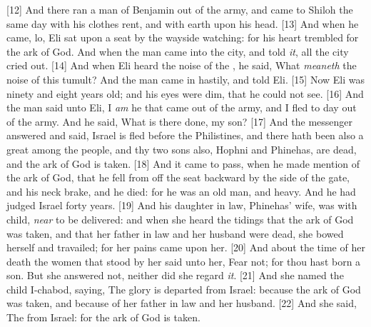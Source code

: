 [12] \textcolor[cmyk]{0.99998,1,0,0}{And there ran a man of Benjamin out of the army, and came to Shiloh the same day with his clothes rent, and with earth upon his head.}
[13] \textcolor[cmyk]{0.99998,1,0,0}{And when he came, lo, Eli sat upon a seat by the wayside watching: for his heart trembled for the ark of God. And when the man came into the city, and told \emph{it}, all the city cried out.}
[14] \textcolor[cmyk]{0.99998,1,0,0}{And when Eli heard the noise of the , he said, What \emph{meaneth} the noise of this tumult? And the man came in hastily, and told Eli.}
[15] \textcolor[cmyk]{0.99998,1,0,0}{Now Eli was ninety and eight years old; and his eyes were dim, that he could not see.}
[16] \textcolor[cmyk]{0.99998,1,0,0}{And the man said unto Eli, I \emph{am} he that came out of the army, and I fled to day out of the army. And he said, What is there done, my son?}
[17] \textcolor[cmyk]{0.99998,1,0,0}{And the messenger answered and said, Israel is fled before the Philistines, and there hath been also a great  among the people, and thy two sons also, Hophni and Phinehas, are dead, and the ark of God is taken.}
[18] \textcolor[cmyk]{0.99998,1,0,0}{And it came to pass, when he made mention of the ark of God, that he fell from off the seat backward by the side of the gate, and his neck brake, and he died: for he was an old man, and heavy. And he had judged Israel forty years.}
[19] \textcolor[cmyk]{0.99998,1,0,0}{And his daughter in law, Phinehas' wife, was with child, \emph{near} to be delivered: and when she heard the tidings that the ark of God was taken, and that her father in law and her husband were dead, she bowed herself and travailed; for her pains came upon her.}
[20] \textcolor[cmyk]{0.99998,1,0,0}{And about the time of her death the women that stood by her said unto her, Fear not; for thou hast born a son. But she answered not, neither did she regard \emph{it}.}
[21] \textcolor[cmyk]{0.99998,1,0,0}{And she named the child I-chabod, saying, The glory is departed from Israel: because the ark of God was taken, and because of her father in law and her husband.}
[22] \textcolor[cmyk]{0.99998,1,0,0}{And she said, The  from Israel: for the ark of God is taken.}